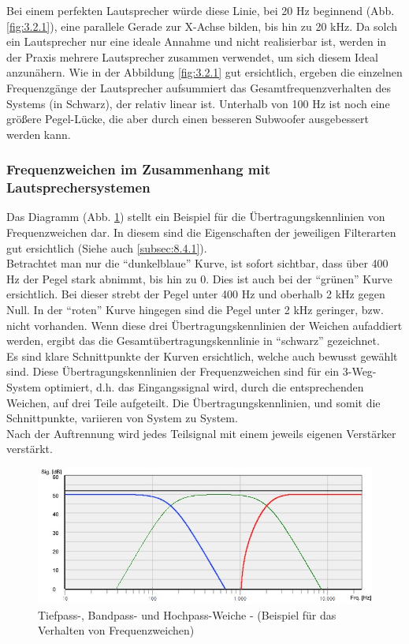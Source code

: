 Bei einem perfekten Lautsprecher würde diese Linie, bei 20 Hz beginnend (Abb. \ref{fig:3.2.1}), eine parallele Gerade zur X-Achse bilden, bis hin zu 20 kHz.
Da solch ein Lautsprecher nur eine ideale Annahme und nicht realisierbar ist, werden in der Praxis mehrere Lautsprecher zusammen verwendet, um sich diesem Ideal anzunähern.
Wie in der Abbildung \ref{fig:3.2.1} gut ersichtlich, ergeben die einzelnen Frequenzgänge der Lautsprecher aufsummiert das Gesamtfrequenzverhalten des Systems (in Schwarz), der relativ linear ist.
Unterhalb von 100 Hz ist noch eine größere Pegel-Lücke, die aber durch einen besseren Subwoofer ausgebessert werden kann.

\subsubsection*{Frequenzweichen im Zusammenhang mit Lautsprechersystemen}
Das Diagramm (Abb. \ref{fig:3.2.2}) stellt ein Beispiel für die Übertragungskennlinien von Frequenzweichen dar.
In diesem sind die Eigenschaften der jeweiligen Filterarten gut ersichtlich (Siehe auch \ref{subsec:8.4.1}).\\
Betrachtet man nur die \enquote{dunkelblaue} Kurve, ist sofort sichtbar, dass über 400 Hz der Pegel stark abnimmt, bis hin zu 0.
Dies ist auch bei der \enquote{grünen} Kurve ersichtlich.
Bei dieser strebt der Pegel unter 400 Hz und oberhalb 2 kHz gegen Null.
In der \enquote{roten} Kurve hingegen sind die Pegel unter 2 kHz geringer, bzw. nicht vorhanden.
Wenn diese drei Übertragungskennlinien der Weichen aufaddiert werden, ergibt das die Gesamtübertragungskennlinie in \enquote{schwarz} gezeichnet.
\\
Es sind klare Schnittpunkte der Kurven ersichtlich, welche auch bewusst gewählt sind.
Diese Übertragungskennlinien der Frequenzweichen sind für ein 3-Weg-System optimiert, d.h. das Eingangssignal wird, durch die entsprechenden Weichen, auf drei Teile aufgeteilt.
Die Übertragungskennlinien, und somit die Schnittpunkte, variieren von System zu System.\\
Nach der Auftrennung wird jedes Teilsignal mit einem jeweils eigenen Verstärker verstärkt.
\begin{figure} [H]
	\centering
	\includegraphics[width=1\textwidth]{img/Grundlagen/Mehrweg-Lautsprechersysteme/Frequenzbereiche-Audio-Weiche-cut.jpg}
	\caption[Tiefpass-, Bandpass- und Hochpass-Weiche - (Beispiel für das Verhalten von Frequenzweichen)]{Tiefpass-, Bandpass- und Hochpass-Weiche - (Beispiel für das Verhalten von Frequenzweichen)\footnotemark}
	\label{fig:3.2.2}
\end{figure}
